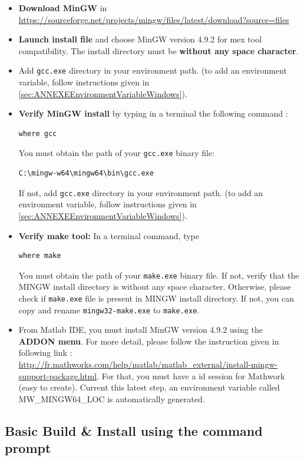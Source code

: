 \begin{itemize}
\item \textbf{Download MinGW} in \url{https://sourceforge.net/projects/mingw/files/latest/download?source=files}
\item \textbf{Launch install file} and choose MinGW version 4.9.2 for mex tool compatibility. The install directory must be \textbf{without any space character}.  
\item Add \texttt{gcc.exe} directory in your environment path. 
(to add an environment variable, follow instructions given in \ref{sec:ANNEXEEnvironmentVariableWindows}). 
\item \textbf{Verify MinGW install} by typing in a terminal the following command : 
\begin{lstlisting}
where gcc
\end{lstlisting}
You must obtain the path of your \texttt{gcc.exe} binary file: 
\begin{lstlisting}
C:\mingw-w64\mingw64\bin\gcc.exe
\end{lstlisting}
If not, add \texttt{gcc.exe} directory in your environment path. 
(to add an environment variable, follow instructions given in \ref{sec:ANNEXEEnvironmentVariableWindows}). 

\item \textbf{Verify make tool:} In a terminal command, type
\begin{lstlisting}
where make
\end{lstlisting}
You must obtain the path of your \texttt{make.exe} binary file. 
If not, verify that the MINGW install directory is without any space character. Otherwise, please check if \texttt{make.exe} file is present in MINGW install directory. If not, you can copy and rename \texttt{mingw32-make.exe} to \texttt{make.exe}.

\item From Matlab IDE, you must install MinGW version 4.9.2 using the \textbf{ADDON menu}. For more detail, please follow the instruction given in following link :  
\url{http://fr.mathworks.com/help/matlab/matlab_external/install-mingw-support-package.html}. For that, you must have a id session for Mathwork (easy to create). Current this latest step, an environment variable called MW\_MINGW64\_LOC is automatically generated. 
\end{itemize}


\subsection{Basic Build \& Install using the command prompt}
\label{sec:WinMinGWBasicInstall}

